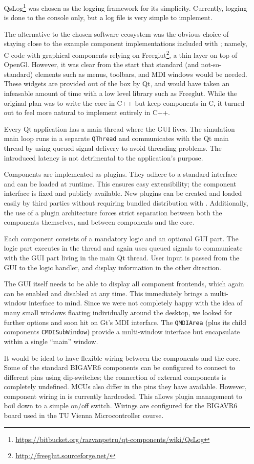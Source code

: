 QsLog\footnote{\url{https://bitbucket.org/razvanpetru/qt-components/wiki/QsLog}}
was chosen as the logging framework for its simplicity. Currently, logging is done
to the console only, but a log file is very simple to implement.

The alternative to the chosen software ecosystem was the obvious choice of
staying close to the example component implementations included with \simavr;
namely, C code with graphical components relying on Freeglut\footnote{
%
\url{http://freeglut.sourceforge.net/}
%
}, a thin layer on top of OpenGl. However, it was clear from the start that
standard (and not-so-standard) elements such as menus, toolbars, and \ac{MDI}
windows would be needed. These widgets are provided out of the box by Qt, and
would have taken an infeasable amount of time with a low level library such as
Freeglut. While the original plan was to write the \qsimavr core in C++ but keep
components in C, it turned out to feel more natural to implement entirely in C++.

Every Qt application has a main thread where the \ac{GUI} lives. The \simavr
simulation main loop runs in a separate \lstinline|QThread| and communicates
with the Qt main thread by using queued signal delivery to avoid threading
problems. The introduced latency is not detrimental to the application's purpose.

Components are implemented as plugins. They adhere to a standard interface and
can be loaded at runtime. This ensures easy extensibility; the component interface
is fixed and publicly available. New plugins can be created and loaded easily by
third parties without requiring bundled distribution with \qsimavr. Additionally,
the use of a plugin architecture forces strict separation between both
the components themselves, and between components and the core.

Each component consists of a mandatory logic and an optional \ac{GUI} part.
The logic part executes in the \simavr thread and again uses queued signals
to communicate with the \ac{GUI} part living in the main Qt thread. User input
is passed from the \ac{GUI} to the logic handler, and display information in the
other direction.

The \ac{GUI} itself needs to be able to display all component frontends, which
again can be enabled and disabled at any time. This immediately brings a multi-window
interface to mind. Since we were not completely happy with the idea of many
small windows floating individually around the desktop, we looked for further options
and soon hit on Gt's \ac{MDI} interface. The \lstinline|QMDIArea| (plus its child
components \lstinline|CMDISubWindow|) provide a multi-window interface but
encapsulate within a single ``main'' window.

It would be ideal to have flexible wiring between the components and the core.
Some of the standard BIGAVR6 components can be configured to connect to different
pins using dip-switches; the connection of external components is completely
undefined. \acp{MCU} also differ in the pins they have available. However,
component wiring in \qsimavr is currently hardcoded. This allows plugin management
to boil down to a simple on/off switch. Wirings are configured for the BIGAVR6
board used in the \ac{TU} Vienna Microcontroller course.
